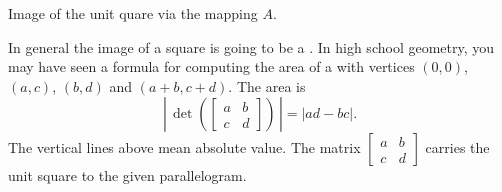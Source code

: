 \begin{myfig}
\capstart
{}
\caption{Image of the unit quare via the mapping
$A$.\label{linalg-imagesquare:fig}}
\end{myfig}

In general the image of a square is going to be a .
In high school geometry, you may have seen a formula for
computing the area of a 
with vertices $(0,0)$, $(a,c)$, $(b,d)$
and $(a+b,c+d)$.  The area is
\begin{equation*}
\left\lvert \, \det \left(
\begin{bmatrix} a & b \\ c & d \end{bmatrix}
\right) \, \right\lvert
=
\lvert
a d - b c
\rvert
.
\end{equation*}
The vertical lines above mean absolute value.
The matrix $\left[ \begin{smallmatrix} a & b \\ c & d \end{smallmatrix}
\right]$
carries the unit square to the given parallelogram.

\medskip

